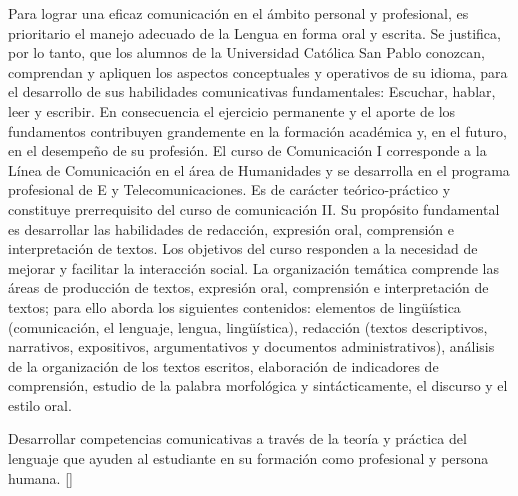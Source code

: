 \begin{syllabus}


\begin{justification}
Para lograr una eficaz comunicación en el ámbito personal y profesional, es prioritario el manejo adecuado de la Lengua en forma oral y escrita. Se justifica, por lo tanto, que los alumnos de la Universidad Católica San Pablo conozcan, comprendan y apliquen los aspectos conceptuales y operativos de su idioma, para el desarrollo de sus habilidades comunicativas fundamentales: Escuchar, hablar, leer y escribir.
En consecuencia el ejercicio permanente y el aporte de los fundamentos contribuyen grandemente en la formación académica y, en el futuro, en el desempeño de su profesión.
El curso de Comunicación I corresponde a la Línea de Comunicación en el área de Humanidades y se desarrolla en el programa profesional de E y Telecomunicaciones. Es de carácter teórico-práctico y constituye prerrequisito del curso de comunicación II. Su propósito fundamental es desarrollar las habilidades de redacción, expresión oral, comprensión e interpretación de textos. Los objetivos del curso responden a la necesidad de mejorar y facilitar la interacción social. La organización temática comprende las  áreas de producción de textos, expresión oral, comprensión e interpretación de textos; para ello aborda los siguientes contenidos: elementos de lingüística (comunicación, el lenguaje, lengua, lingüística), redacción (textos descriptivos, narrativos, expositivos, argumentativos y documentos administrativos), análisis de la organización de los textos escritos, elaboración de indicadores de comprensión, estudio de la palabra morfológica y sintácticamente, el discurso y el estilo oral.
\end{justification}

\begin{goals}
\item Desarrollar competencias comunicativas a través de la teoría y práctica del lenguaje que ayuden al estudiante en su formación como profesional y persona humana. [\Usage]
\end{goals}

\begin{outcomes}
   \item {}
   \item {}
\end{outcomes}

\begin{competences}
    \item {}
    \item {}
\end{competences}


\end{syllabus}

